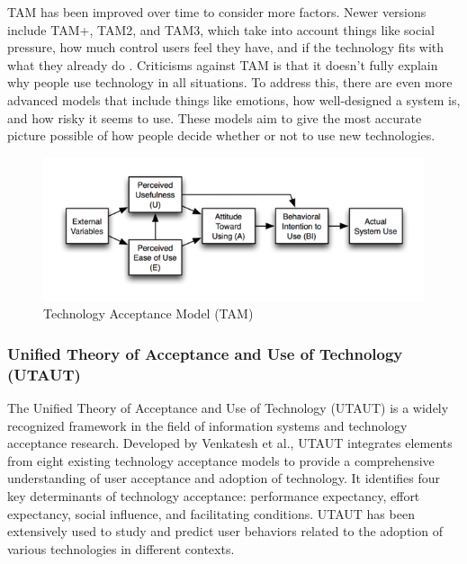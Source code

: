 \documentclass[journal,onecolumn]{IEEEtran}
\begin{document}
TAM has been improved over time to consider more factors. Newer versions include TAM+, TAM2, and TAM3, which take into account things like social pressure, how much control users feel they have, and if the technology fits with what they already do \cite{venkatesh_theoretical_2000}. Criticisms against TAM is that it doesn't fully explain why people use technology in all situations. To address this, there are even more advanced models that include things like emotions, how well-designed a system is, and how risky it seems to use. These models aim to give the most accurate picture possible of how people decide whether or not to use new technologies.
\begin{figure}[b]
    \centering
    \includegraphics[width=1\linewidth]{img/Picture2.png}
    \caption{Technology Acceptance Model (TAM) }
    \label{fig:TAM}
\end{figure}

\subsubsection{Unified Theory of Acceptance and Use of Technology (UTAUT)}
The Unified Theory of Acceptance and Use of Technology (UTAUT) is a widely recognized framework in the field of information systems and technology acceptance research. Developed by Venkatesh et al., UTAUT integrates elements from eight existing technology acceptance models to provide a comprehensive understanding of user acceptance and adoption of technology. It identifies four key determinants of technology acceptance: performance expectancy, effort expectancy, social influence, and facilitating conditions. UTAUT has been extensively used to study and predict user behaviors related to the adoption of various technologies in different contexts.  
\end{document}
